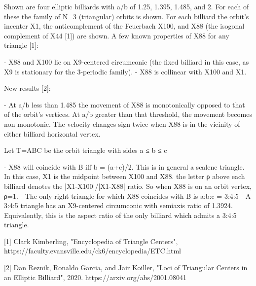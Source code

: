 Shown are four elliptic billiards with a/b of 1.25, 1.395, 1.485, and 2. For each of these the family of N=3 (triangular) orbits is shown. For each billiard the orbit's incenter X1, the anticomplement of the Feuerbach X100, and X88 (the isogonal complement of X44 [1]) are shown. A few known properties of X88 for any triangle [1]:

- X88 and X100 lie on X9-centered circumconic (the fixed billiard in this case, as X9 is stationary for the 3-periodic family).
- X88 is collinear with X100 and X1.

New results [2]:

- At a/b less than 1.485 the movement of X88 is monotonically opposed to that of the orbit's vertices. At a/b greater than that threshold, the movement becomes non-monotonic. The velocity changes sign twice when X88 is in the vicinity of either billiard horizontal vertex.

Let T=ABC be the orbit triangle with sides a ≤  b ≤ c

- X88 will coincide with B iff b = (a+c)/2. This is in general a scalene triangle. In this case, X1 is the midpoint between X100 and X88. the letter ρ above each billiard denotes the |X1-X100|/|X1-X88| ratio. So when X88 is on an orbit vertex, ρ=1.
- The only right-triangle for which X88 coincides with B is a:b:c = 3:4:5
- A 3:4:5 triangle has an X9-centered circumconic with semiaxis ratio of 1.3924. Equivalently, this is the aspect ratio of the only billiard which admits a 3:4:5 triangle.

[1] Clark Kimberling, "Encyclopedia of Triangle Centers", https://faculty.evansville.edu/ck6/encyclopedia/ETC.html

[2] Dan Reznik, Ronaldo Garcia, and Jair Koiller, "Loci of Triangular Centers in an Elliptic Billiard", 2020. https://arxiv.org/abs/2001.08041